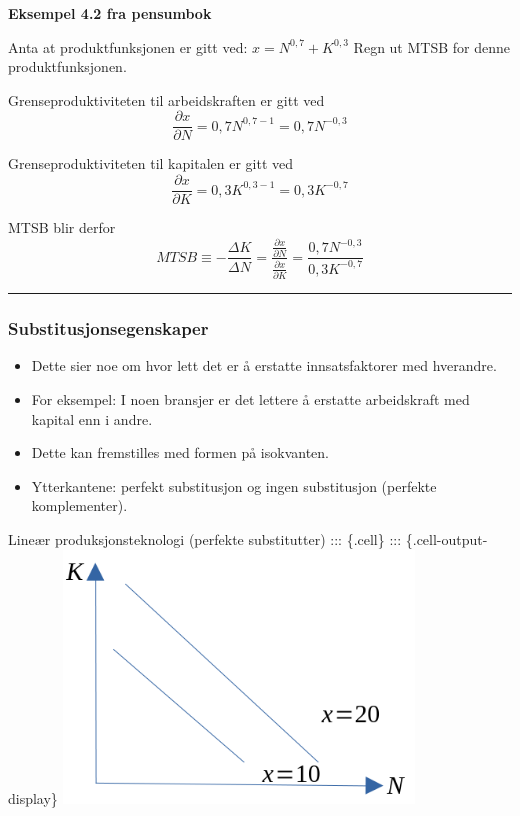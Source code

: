 \documentclass[
  letterpaper,
  DIV=11,
  numbers=noendperiod]{scrartcl}
\providecommand{\tightlist}{%
  \setlength{\itemsep}{0pt}\setlength{\parskip}{0pt}}\usepackage{longtable,booktabs,array}
\begin{document}
\textbf{Eksempel 4.2 fra pensumbok}

Anta at produktfunksjonen er gitt ved: \(x = N^{0,7}+K^{0,3}\) Regn ut
MTSB for denne produktfunksjonen.

Grenseproduktiviteten til arbeidskraften er gitt ved \[
\frac{\partial x}{\partial N} = 0,7N^{0,7-1} =  0,7N^{-0,3} 
\]

Grenseproduktiviteten til kapitalen er gitt ved \[
\frac{\partial x}{\partial K} = 0,3K^{0,3-1} =  0,3K^{-0,7} 
\]

MTSB blir derfor \[
MTSB \equiv - \frac{\Delta K}{\Delta N} = \frac{\frac{\partial x}{\partial N}}{\frac{\partial x}{\partial K}} = \frac{0,7N^{-0,3}}{0,3K^{-0,7}} 
\]

\begin{center}\rule{0.5\linewidth}{0.5pt}\end{center}

\subsubsection{Substitusjonsegenskaper}\label{substitusjonsegenskaper}

\begin{itemize}
\tightlist
\item
  Dette sier noe om hvor lett det er å erstatte innsatsfaktorer med
  hverandre.
\item
  For eksempel: I noen bransjer er det lettere å erstatte arbeidskraft
  med kapital enn i andre.
\item
  Dette kan fremstilles med formen på isokvanten.
\item
  Ytterkantene: perfekt substitusjon og ingen substitusjon (perfekte
  komplementer).
\end{itemize}

Lineær produksjonsteknologi (perfekte substitutter) ::: \{.cell\} :::
\{.cell-output-display\}
\includegraphics[width=0.7\textwidth,height=\textheight]{drawio/linsub.png}
\end{document}
